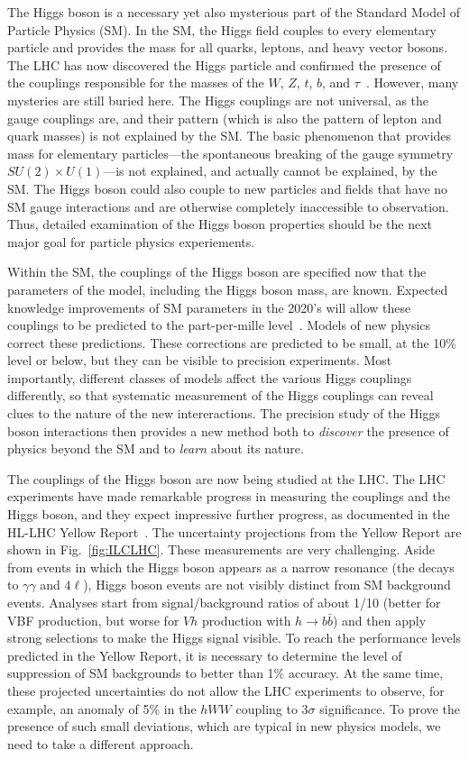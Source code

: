 \documentclass[%
 reprint,
 amsmath,amssymb,
 aps,
]{revtex4-1}
\begin{document}
The Higgs boson is a necessary yet also mysterious part of the
Standard Model of Particle Physics (SM).    In the SM, the Higgs field
couples to every elementary particle and provides the mass for all
quarks, leptons, and heavy vector bosons.   The LHC has now discovered
the Higgs particle and confirmed the presence of the couplings responsible for the
masses of the $W$, $Z$, $t$, $b$, and $\tau$~\cite{LHCHiggssummary}. 
 However, many mysteries are still
buried here.   The Higgs couplings are not universal, as the gauge
couplings are, and their pattern (which is also the pattern of lepton
and quark masses) is not explained by the SM.  The basic phenomenon that provides
mass for elementary particles---the spontaneous breaking of the gauge
symmetry $SU(2)\times U(1)$---is not explained, and actually cannot be
explained, by the SM.   The Higgs boson could also couple to new
particles and fields that have no SM gauge interactions and are
otherwise completely inaccessible to observation.  Thus, detailed
examination of the Higgs boson properties should be the next major
goal for particle physics experiements.

Within the SM, the couplings of the Higgs boson are specified now that
the parameters of the model, including the Higgs boson mass, are
known.  Expected knowledge improvements of SM parameters in the 2020's will allow these couplings to be predicted to the part-per-mille level~\cite{Lepage:2014fla}.
Models of new physics correct  these predictions.   These corrections
are predicted to be small, at the 10\% level or below, but they can
be visible to precision experiments.   Most importantly, different
classes of models affect the various Higgs couplings differently, so that
systematic measurement of the Higgs couplings can reveal clues to the
nature of the new intereractions.   The precision study of the Higgs
boson interactions then provides a new method both to {\it discover}  the
presence of physics beyond the SM and to {\it learn}  about its nature.

The couplings of the Higgs boson are now being studied at the LHC.
The LHC experiments have made remarkable progress in measuring the
couplings and the Higgs boson, and they expect impressive further progress, as
documented in the HL-LHC Yellow Report~\cite{Yellow}.  The uncertainty
projections
from the Yellow Report  are shown in Fig.~\ref{fig:ILCLHC}.   These
measurements are very challenging.   Aside from events in
which the Higgs boson appears as a narrow resonance (the decays to
$\gamma\gamma$ and $4\ell$), Higgs boson events are not visibly
distinct from SM background events.  Analyses start from
signal/background ratios of about  1/10  (better for VBF production,
but 
worse for $Vh$ production with $h\to b\bar b$) and then apply strong
selections to make the Higgs signal visible.   To reach the
performance levels predicted in  the Yellow Report, it is necessary to
determine the level of suppression of SM backgrounds to better than
 1\% accuracy.  At
the same time, these projected uncertainties do not allow the LHC experiments to
observe, for example, an anomaly of 5\% in the $hWW$ coupling to
3$\sigma$ significance.   To prove the presence of such small
deviations, which are typical in new physics models, we need to take a
different approach. 
\end{document}
